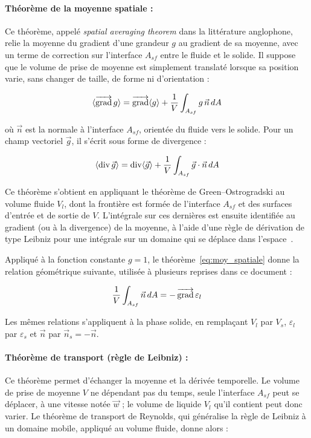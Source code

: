 \paragraph{Théorème de la moyenne spatiale :}
Ce théorème, appelé \emph{spatial averaging theorem} dans la littérature
anglophone, relie la moyenne du gradient d'une grandeur $g$ au gradient de sa
moyenne, avec un terme de correction sur l'interface $A_{sf}$ entre le fluide
et le solide. Il suppose que le volume de prise de moyenne est simplement
translaté lorsque sa position varie, sans changer de taille, de forme ni
d'orientation :

\begin{equation}
\langle \mathop{\overrightarrow{\operatorname{grad}}}\nolimits g \rangle = \mathop{\overrightarrow{\operatorname{grad}}}\nolimits\langle g \rangle + \frac{1}{V}\int_{A_{sf}} g\,\vec{n}\, dA \label{eq:moy_spatiale}
\end{equation}

où $\vec{n}$ est la normale à l'interface $A_{sf}$, orientée du fluide vers le
solide. Pour un champ vectoriel $\vec{g}$, il s'écrit sous forme de divergence :

\begin{equation}
\langle \operatorname{div}\vec{g} \rangle = \operatorname{div}\langle \vec{g} \rangle + \frac{1}{V}\int_{A_{sf}} \vec{g}\cdot\vec{n}\, dA \label{eq:moy_spatiale_div}
\end{equation}

Ce théorème s'obtient en appliquant le théorème de Green--Ostrogradski au
volume fluide $V_l$, dont la frontière est formée de l'interface $A_{sf}$ et des
surfaces d'entrée et de sortie de $V$. L'intégrale sur ces dernières est
ensuite identifiée au gradient (ou à la divergence) de la moyenne, à l'aide
d'une règle de dérivation de type Leibniz pour une intégrale sur un domaine qui
se déplace dans l'espace~\cite{whitakerMethodVolumeAveraging1999}.

Appliqué à la fonction constante $g = 1$, le théorème~\eqref{eq:moy_spatiale}
donne la relation géométrique suivante, utilisée à plusieurs reprises dans ce
document :

\begin{equation}
\frac{1}{V}\int_{A_{sf}} \vec{n}\, dA = -\mathop{\overrightarrow{\operatorname{grad}}}\nolimits\varepsilon_l
\label{eq:grad_porosite}
\end{equation}

Les mêmes relations s'appliquent à la phase solide, en remplaçant $V_l$ par
$V_s$, $\varepsilon_l$ par $\varepsilon_s$ et $\vec{n}$ par
$\vec{n}_s = -\vec{n}$.

\paragraph{Théorème de transport (règle de Leibniz) :}
Ce théorème permet d'échanger la moyenne et la dérivée temporelle. Le volume de
prise de moyenne $V$ ne dépendant pas du temps, seule l'interface $A_{sf}$
peut se déplacer, à une vitesse notée $\vec{w}$ ; le volume de liquide $V_l$
qu'il contient peut donc varier. Le théorème de transport de Reynolds, qui
généralise la règle de Leibniz à un domaine mobile, appliqué au volume
fluide, donne alors :

